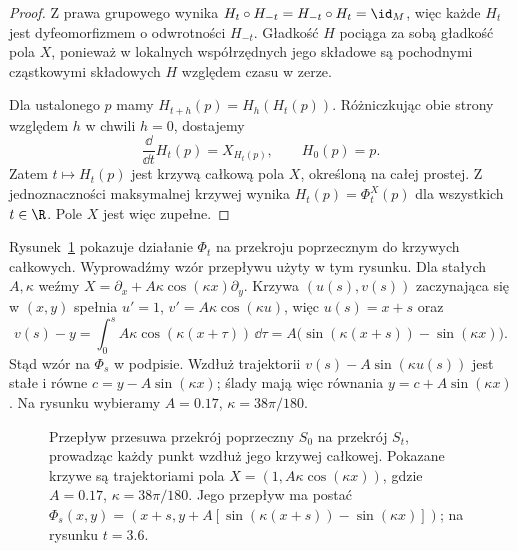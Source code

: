 \begin{proof}
Z prawa grupowego wynika
$H_t\circ H_{-t}=H_{-t}\circ H_t=\id_M$, więc każde $H_t$
jest dyfeomorfizmem o odwrotności $H_{-t}$.
Gładkość $H$ pociąga za sobą gładkość pola $X$,
ponieważ w lokalnych współrzędnych jego składowe są pochodnymi
cząstkowymi składowych $H$ względem czasu w zerze.

Dla ustalonego $p$ mamy $H_{t+h}(p)=H_h(H_t(p))$.
Różniczkując obie strony względem $h$ w chwili $h=0$,
dostajemy
\[
\frac{\dd}{\dd t}H_t(p)=X_{H_t(p)},\qquad H_0(p)=p.
\]
Zatem $t\mapsto H_t(p)$ jest krzywą całkową pola $X$,
określoną na całej prostej. Z jednoznaczności maksymalnej krzywej
wynika $H_t(p)=\Phi_t^X(p)$ dla wszystkich $t\in\R$.
Pole $X$ jest więc zupełne.
\end{proof}

Rysunek~\ref{fig:przeplyw-przekroj} pokazuje działanie $\Phi_t$
na przekroju poprzecznym do krzywych całkowych.
Wyprowadźmy wzór przepływu użyty w tym rysunku.
Dla stałych $A,\kappa$ weźmy
$X=\partial_x+A\kappa\cos(\kappa x)\partial_y$.
Krzywa $(u(s),v(s))$ zaczynająca się w $(x,y)$ spełnia
$u'=1$, $v'=A\kappa\cos(\kappa u)$, więc $u(s)=x+s$ oraz
\[
 v(s)-y
 =\int_0^s A\kappa\cos(\kappa(x+\tau))\,\dd\tau
 =A\bigl(\sin(\kappa(x+s))-\sin(\kappa x)\bigr).
\]
Stąd wzór na $\Phi_s$ w podpisie.
Wzdłuż trajektorii $v(s)-A\sin(\kappa u(s))$
jest stałe i równe $c=y-A\sin(\kappa x)$;
ślady mają więc równania $y=c+A\sin(\kappa x)$.
Na rysunku wybieramy $A=0.17$, $\kappa=38\pi/180$.
\begin{figure}[H]
\centering
{}

\caption{Przepływ przesuwa przekrój poprzeczny $S_0$
na przekrój $S_t$, prowadząc każdy punkt wzdłuż jego krzywej
całkowej. Pokazane krzywe są trajektoriami pola
$X=(1,A\kappa\cos(\kappa x))$, gdzie $A=0.17$,
$\kappa=38\pi/180$. Jego przepływ ma postać
$\Phi_s(x,y)=(x+s,y+A[\sin(\kappa(x+s))-\sin(\kappa x)])$;
na rysunku $t=3.6$.}
\label{fig:przeplyw-przekroj}
\end{figure}

